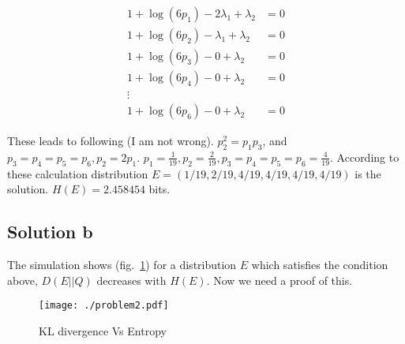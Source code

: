 \documentclass[]{article}
\begin{document}
\[
\begin{aligned}
1 + \log( 6p_1 ) - 2 \lambda_1 + \lambda_2 &= 0 \\
1 + \log( 6p_2 ) - \lambda_1 + \lambda_2 &= 0 \\
1 + \log( 6p_3 ) - 0 + \lambda_2 &= 0 \\
1 + \log( 6p_4 ) - 0 + \lambda_2 &= 0 \\
\vdots \\
1 + \log( 6p_6 ) - 0 + \lambda_2 &= 0
\end{aligned}
\]

These leads to following (I am not wrong). \(p_2^2 = p_1 p_3\), and
\(p_3=p_4=p_5=p_6, p_2=2p_1\).
\(p_1=\frac{1}{19}, p_2=\frac{2}{19}, p_3=p_4=p_5=p_6=\frac{4}{19}\).
According to these calculation distribution
\(E=(1/19,2/19,4/19,4/19,4/19,4/19)\) is the solution. \(H(E)=2.458454\)
bits.

\subsection{Solution b}\label{solution-b}

The simulation shows (fig.~\ref{fig:hvsd}) for a distribution \(E\)
which satisfies the condition above, \(D(E||Q)\) decreases with
\(H(E)\). Now we need a proof of this.

\begin{figure}
\centering
\texttt{[image: ./problem2.pdf]}
\caption{KL divergence Vs Entropy}\label{fig:hvsd}
\end{figure}
\end{document}

